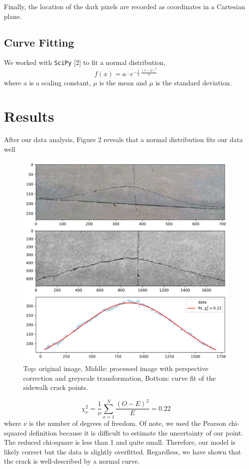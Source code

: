 \documentclass{article}
\begin{document}
Finally, the location of the dark pixels are recorded as coordinates in a Cartesian plane.
\subsection{Curve Fitting}
We worked with \texttt{SciPy} [2] to fit a normal distribution,
\begin{equation}
    f(x) = a \cdot e^{-\frac{1}{2} \ \frac{(x - \mu)^2}{\sigma}}
\end{equation}
where a is a scaling constant, $\mu$ is the mean and $\mu$ is the standard deviation.

\section{Results}
After our data analysis, Figure 2 reveals that a normal distribution fits our data well
\begin{figure}[h]
    \centering
    \includegraphics[width=13cm]{fit.png}
    \caption{Top: original image, Middle: processed image with perspective correction and greyscale transformation, Bottom: curve fit of the sidewalk crack points.}
    \label{fig:Results}
\end{figure}
\begin{equation}
    \chi^2_{\nu} = \frac{1}{\nu} \sum_{x=1}^{N} \frac{(O - E)^2}{E} = 0.22
\end{equation}
where $\nu$ is the number of degrees of freedom. Of note, we used the Pearson chi-squared definition because it is difficult to estimate the uncertainty of our point. 
The reduced chi-square is less than 1 and quite small. Therefore, our model is likely correct but the data is slightly overfitted. Regardless, we have shown that the crack is well-described by a normal curve.




\nocite{*}
\end{document}
